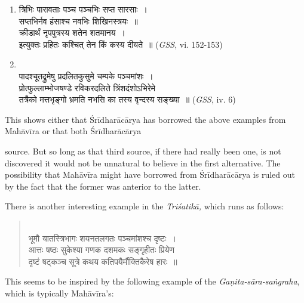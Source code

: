 \documentclass[10pt, openany]{book}
\begin{document}
\begin{enumerate}[(1)]
\item {\qt त्रिभिः पारावताः पञ्च पञ्चभिः सप्त सारसाः~।\\
सप्तभिर्नव हंसाश्च नवभिः शिखिनस्त्रयः~॥\\
क्रीडार्थं नृपपुत्रस्य शतेन शतमानय~।\\
इत्युक्तः प्रहितः कश्चित् तेन किं कस्य दीयते~॥ } \hfill \englishfont (\emph{GSS}, vi. 152-153)
\item {\\
{पादश्चूतद्रुमेषु प्रदलितकुसुमे चम्पके पञ्चमांशः~।}\\
{प्रोत्फुल्लाम्भोजषण्डे रविकरदलिते त्रिंशदंशोऽभिरेमे }\\
{तत्रैको मत्तभृङ्गो भ्रमति नभसि का तस्य वृन्दस्य सङ्ख्या~॥}} \hfill \englishfont (\emph{GSS}, iv. 6)
\end{enumerate}

{This shows either that Śrīdharācārya has borrowed the above examples from Mahāvīra or that both Śrīdharācārya}

\newpage

\englishfont{} 
{source. But so long as that third source, if there had really}
{been one, is not discovered it would not be unnatural to}
{believe in the first alternative. The possibility that Mahāvīra}
{might have borrowed from Śrīdharācārya is ruled out by the}
{fact that the former was anterior to the latter.}
\vspace{-1mm}

{There is another interesting example in the \textit{Triśatikā,}}
{which runs as follows:}

\begin{quote}
{\\
{भूमौ यातस्त्रिभागः शयनतलगतः पञ्चमांशश्च दृष्टः~।} \\
{आत्तः षष्ठः सुकेश्या गणक दशमकः सङ्गृहीतः प्रियेण }\\
{दृष्टं षट्कञ्च सूत्रे कथय कतिपयैर्मौक्तिकैरेष हारः~॥ }}
\end{quote}
\vspace{-4mm}

\hfill {}
\vspace{3mm}

{This seems to be inspired by the following example of the \textit{Gaṇita-sāra-saṅgraha}, which is typically Mahāvīra's:}
\end{document}
